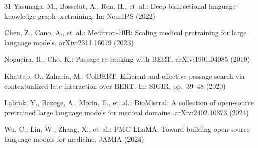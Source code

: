 \documentclass[runningheads]{llncs}
\begin{document}
\begin{thebibliography}{31}
Yasunaga, M., Bosselut, A., Ren, H., et~al.: Deep bidirectional language-knowledge graph pretraining. In: NeurIPS (2022)

Chen, Z., Cano, A., et~al.: Meditron-70B: Scaling medical pretraining for large language models. arXiv:2311.16079 (2023)

Nogueira, R., Cho, K.: Passage re-ranking with BERT. arXiv:1901.04085 (2019)

Khattab, O., Zaharia, M.: ColBERT: Efficient and effective passage search via contextualized late interaction over BERT. In: SIGIR, pp.~39--48 (2020)

Labrak, Y., Bazoge, A., Morin, E., et~al.: BioMistral: A collection of open-source pretrained large language models for medical domains. arXiv:2402.10373 (2024)

Wu, C., Lin, W., Zhang, X., et~al.: PMC-LLaMA: Toward building open-source language models for medicine. JAMIA (2024)

\end{thebibliography}
\end{document}
